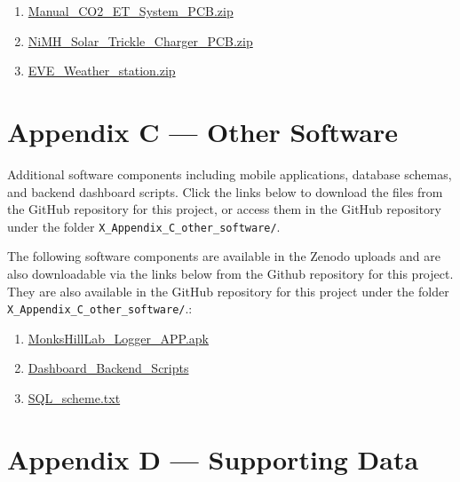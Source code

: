 \documentclass[
  11pt,
  letterpaper,
]{book}
\begin{document}
\begin{enumerate}
  \href{https://github.com/zalf-lli/LCSfFE-handbook/blob/main/X_Appendix_B_3D_printing_PCB_board_files/Automatic_NDVI_PRI_System_PCB.zip}{Automatic\_NDVI\_PRI\_System\_PCB.zip}
\item
  \href{https://github.com/zalf-lli/LCSfFE-handbook/blob/main/X_Appendix_B_3D_printing_PCB_board_files/Manual_CO2_ET_System_PCB.zip}{Manual\_CO2\_ET\_System\_PCB.zip}
\item
  \href{https://github.com/zalf-lli/LCSfFE-handbook/blob/main/X_Appendix_B_3D_printing_PCB_board_files/NiMH_Solar_Trickle_Charger_PCB.zip}{NiMH\_Solar\_Trickle\_Charger\_PCB.zip}
\item
  \href{https://github.com/zalf-lli/LCSfFE-handbook/blob/main/X_Appendix_B_3D_printing_PCB_board_files/EVE_Weather_station.zip}{EVE\_Weather\_station.zip}
\end{enumerate}

\section{Appendix C --- Other Software}\label{sec-appendix_C}

Additional software components including mobile applications, database
schemas, and backend dashboard scripts. Click the links below to
download the files from the GitHub repository for this project, or
access them in the GitHub repository under the folder
\texttt{X\_Appendix\_C\_other\_software/}.

The following software components are available in the Zenodo uploads
and are also downloadable via the links below from the Github repository
for this project. They are also available in the GitHub repository for
this project under the folder
\texttt{X\_Appendix\_C\_other\_software/}.:

\begin{enumerate}
\def\labelenumi{\arabic{enumi}.}
\item
  \href{https://github.com/zalf-lli/LCSfFE-handbook/blob/main/X_Appendix_C_other_software/MonksHillLab_Logger_APP.apk}{MonksHillLab\_Logger\_APP.apk}
\item
  \href{https://github.com/zalf-lli/LCSfFE-handbook/tree/main/X_Appendix_C_other_software/Dashboard_Backend_Scripts}{Dashboard\_Backend\_Scripts}
\item
  \href{https://github.com/zalf-lli/LCSfFE-handbook/blob/main/X_Appendix_C_other_software/SQL_scheme.txt}{SQL\_scheme.txt}
\end{enumerate}

\section{Appendix D --- Supporting Data}\label{sec-appendix_D}
\end{document}
